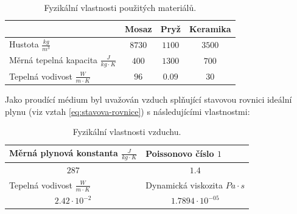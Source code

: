             \renewcommand{\arraystretch}{2}
            \begin{table}[ht!]
                \centering
                \begin{tabular}{l|l|l|l}
                                                                                  & Mosaz                        & Pryž                        &  Keramika                      \\ \hline
                    Hustota $\unit{\frac{kg}{m^3}}$                               & \multicolumn{1}{c|}{$8730$}  & \multicolumn{1}{c|}{$1100$} & \multicolumn{1}{c}{$3500$}     \\ \hline
                    Měrná tepelná kapacita $\unit{\frac{J}{kg \cdot K}}$          & \multicolumn{1}{c|}{$400$}   & \multicolumn{1}{c|}{$1300$} & \multicolumn{1}{c}{$700$}      \\ \hline
                    Tepelná vodivost $\unit{\frac{W}{m \cdot K}}$                 & \multicolumn{1}{c|}{$96$}    & \multicolumn{1}{c|}{$0.09$} & \multicolumn{1}{c}{$30$}      
                \end{tabular}%
                \caption{Fyzikální vlastnosti použitých materiálů.}
                \label{tab:materialy}
            \end{table}
            
            Jako proudící médium byl uvažován vzduch splňující stavovou rovnici ideální plynu (viz vztah \ref{eq:stavova-rovnice}) s následujícími vlastnostmi:

		\begin{table}[ht!]
			\centering
			\begin{tabular}{l|l}
				Měrná plynová konstanta $\unit{\frac{J}{kg \cdot K}}$ & Poissonovo číslo $\unit{1}$ \\ \hline
				\multicolumn{1}{c|}{$287$}                                                                        & \multicolumn{1}{c}{$1.4$}                \\ \hline
				Tepelná vodivost $\unit{\frac{W}{m \cdot K}}$ & Dynamická viskozita $\unit{Pa \cdot s}$ \\ \hline				
				\multicolumn{1}{c|}{$2.42 \cdot 10^{-2}$}                          &  \multicolumn{1}{c}{$1.7894 \cdot 10^{-05}$}     
			\end{tabular}%
			\caption{Fyzikální vlastnosti vzduchu.}
			\label{tab:vzduch}
		\end{table}
            
